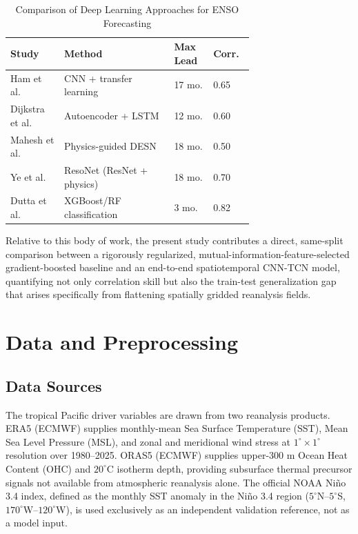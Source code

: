 \documentclass[conference]{IEEEtran}
\begin{document}
\begin{table}[t]
\centering
\caption{Comparison of Deep Learning Approaches for ENSO Forecasting}
\label{tab:litreview}
\begin{tabular}{@{}p{0.16\linewidth}p{0.36\linewidth}p{0.1\linewidth}p{0.08\linewidth}@{}}
\toprule
\textbf{Study} & \textbf{Method} & \textbf{Max Lead} & \textbf{Corr.} \\
\midrule
Ham et al.\ \cite{ham2019} & CNN + transfer learning & 17 mo. & 0.65 \\
Dijkstra et al.\ \cite{dijkstra2019} & Autoencoder + LSTM & 12 mo. & 0.60 \\
Mahesh et al.\ \cite{mahesh2024} & Physics-guided DESN & 18 mo. & 0.50 \\
Ye et al.\ \cite{ye2024} & ResoNet (ResNet + physics) & 18 mo. & 0.70 \\
Dutta et al.\ \cite{dutta2024} & XGBoost/RF classification & 3 mo. & 0.82 \\
\bottomrule
\end{tabular}
\end{table}

Relative to this body of work, the present study contributes a direct, same-split comparison between a rigorously regularized, mutual-information-feature-selected gradient-boosted baseline and an end-to-end spatiotemporal CNN-TCN model, quantifying not only correlation skill but also the train-test generalization gap that arises specifically from flattening spatially gridded reanalysis fields.

\section{Data and Preprocessing}

\subsection{Data Sources}
The tropical Pacific driver variables are drawn from two reanalysis products. ERA5 \cite{era5} (ECMWF) supplies monthly-mean Sea Surface Temperature (SST), Mean Sea Level Pressure (MSL), and zonal and meridional wind stress at $1^{\circ}\times1^{\circ}$ resolution over 1980--2025. ORAS5 (ECMWF) supplies upper-300 m Ocean Heat Content (OHC) and $20^{\circ}$C isotherm depth, providing subsurface thermal precursor signals not available from atmospheric reanalysis alone. The official NOAA Ni\~no 3.4 index, defined as the monthly SST anomaly in the Ni\~no 3.4 region ($5^{\circ}$N--$5^{\circ}$S, $170^{\circ}$W--$120^{\circ}$W), is used exclusively as an independent validation reference, not as a model input.
\end{document}
